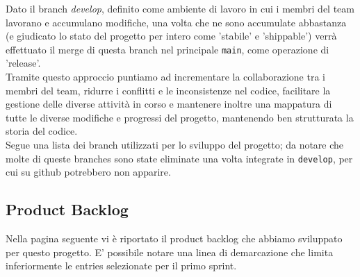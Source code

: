 \documentclass{article}
\begin{document}
\noindent
Dato il branch \textit{develop}, definito come ambiente di lavoro in cui i membri del team lavorano e accumulano modifiche, una volta che ne sono accumulate abbastanza (e giudicato lo stato del progetto per intero come 'stabile' e 'shippable') verrà effettuato il merge di questa branch nel principale \texttt{main}, come operazione di 'release'. \\

\noindent
Tramite questo approccio puntiamo ad incrementare la collaborazione tra i membri del team, ridurre i conflitti e le inconsistenze nel codice, facilitare la gestione delle diverse attività in corso e mantenere inoltre una mappatura di tutte le diverse modifiche e progressi del progetto, mantenendo ben strutturata la storia del codice.\\

Segue una lista dei branch utilizzati per lo sviluppo del progetto; da notare che molte di queste branches sono state eliminate una volta integrate in \texttt{develop}, per cui su github potrebbero non apparire.



\clearpage

\subsection{Product Backlog}
Nella pagina seguente vi è riportato il product backlog che abbiamo sviluppato per questo progetto. E' possibile notare una linea di demarcazione che limita inferiormente le entries selezionate per il primo sprint.
\end{document}

